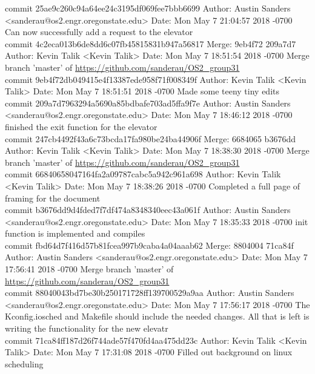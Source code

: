 \documentclass[onecolumn, draftclsnofoot,10pt, compsoc]{IEEEtran}
\begin{document}
{commit 25ae9c260c94a64ee24c3195df069fee7bbb6699
Author: Austin Sanders <sanderau@os2.engr.oregonstate.edu>
Date:   Mon May 7 21:04:57 2018 -0700
Can now successfully add a request to the elevator\\

commit 4c2eca013b6de8dd6c07fb45815831b947a56817
Merge: 9eb4f72 209a7d7
Author: Kevin Talik <Kevin Talik>
Date:   Mon May 7 18:51:54 2018 -0700
Merge branch 'master' of \url{https://github.com/sanderau/OS2_group31}\\

commit 9eb4f72db049415e4f13387ede958f71f008349f
Author: Kevin Talik <Kevin Talik>
Date:   Mon May 7 18:51:51 2018 -0700
Made some teeny tiny edits\\

commit 209a7d7963294a5690a85bdbafe703ad5ffa9f7e
Author: Austin Sanders <sanderau@os2.engr.oregonstate.edu>
Date:   Mon May 7 18:46:12 2018 -0700
finished the exit function for the elevator\\

commit 247cb4492f43a6c73bcda17fa980be24ba44906f
Merge: 6684065 b3676dd
Author: Kevin Talik <Kevin Talik>
Date:   Mon May 7 18:38:30 2018 -0700
Merge branch 'master' of \url{https://github.com/sanderau/OS2_group31}\\

commit 66840658047164fa2a09787cabc5a942c961a698
Author: Kevin Talik <Kevin Talik>
Date:   Mon May 7 18:38:26 2018 -0700
Completed a full page of framing for the document\\

commit b3676dd9d4fded7f7df474a8348340eec43a061f
Author: Austin Sanders <sanderau@os2.engr.oregonstate.edu>
Date:   Mon May 7 18:35:33 2018 -0700
init function is implemented and compiles\\

commit fbd64d7f416d57b81fcea997b9caba4a04aaab62
Merge: 8804004 71ca84f
Author: Austin Sanders <sanderau@os2.engr.oregonstate.edu>
Date:   Mon May 7 17:56:41 2018 -0700
Merge branch 'master' of \url{https://github.com/sanderau/OS2_group31}\\

commit 88040043bd7be30b250171728ff139700529a9aa
Author: Austin Sanders <sanderau@os2.engr.oregonstate.edu>
Date:   Mon May 7 17:56:17 2018 -0700
The Kconfig.iosched and Makefile should include the needed changes. All that is left is writing the functionality for the new elevatr\\

commit 71ca84ff187d26f744ade57f470fd4aa475dd23c
Author: Kevin Talik <Kevin Talik>
Date:   Mon May 7 17:31:08 2018 -0700
Filled out background on linux scheduling\\

}
\end{document}
